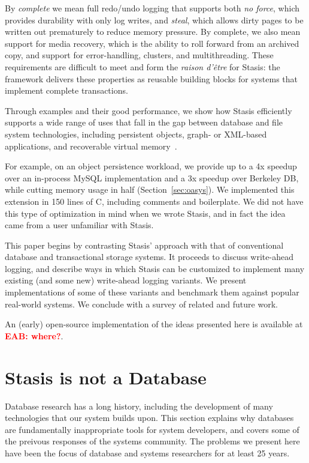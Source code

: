\documentclass[letterpaper,twocolumn,10pt]{article}
\newcommand{\yad}{Stasis\xspace}
\newcommand{\yads}{Stasis'\xspace}
\newcommand{\eab}[1]{\textcolor{red}{\bf EAB: #1}}
\begin{document}
By {\em complete} we mean full redo/undo logging that supports
both {\em no force}, which provides durability with only log writes,
and {\em steal}, which allows dirty pages to be written out prematurely
to reduce memory pressure. By complete, we also
mean support for media recovery, which is the ability to roll
forward from an archived copy, and support for error-handling,
clusters, and multithreading. These requirements are difficult
to meet and form the {\em raison d'\^etre} for \yad{}: the framework
delivers these properties as reusable building blocks for systems
that implement complete transactions.

Through examples and their good performance, we show how \yad{}
efficiently supports a wide range of uses that fall in the gap between 
database and file system technologies, including
persistent objects, graph- or XML-based applications, and recoverable
virtual memory~\cite{lrvm}.  

For example, on an object persistence workload, we provide up to 
a 4x speedup over an in-process MySQL implementation and a 3x speedup over Berkeley DB, while 
cutting memory usage in half (Section~\ref{sec:oasys}). 
We implemented this extension in 150 lines of C, including comments and boilerplate.  We did not have this type of optimization
in mind when we wrote \yad, and in fact the idea came from a
user unfamiliar with \yad.


This paper begins by contrasting \yads approach with that of
conventional database and transactional storage systems.  It proceeds
to discuss write-ahead logging, and describe ways in which \yad can be
customized to implement many existing (and some new) write-ahead
logging variants.  We present implementations of some of these variants and
benchmark them against popular real-world systems.  We
conclude with a survey of related and future work.

An (early) open-source implementation of
the ideas presented here is available at \eab{where?}.

\section{\yad is not a Database}
\label{sec:notDB}

Database research has a long history, including the development of
many technologies that our system builds upon.  This section explains
why databases are fundamentally inappropriate tools for system
developers, and covers some of the preivous responses of the systems
community.  The problems we present here have been the focus of
database and systems researchers for at least 25 years.
\end{document}
